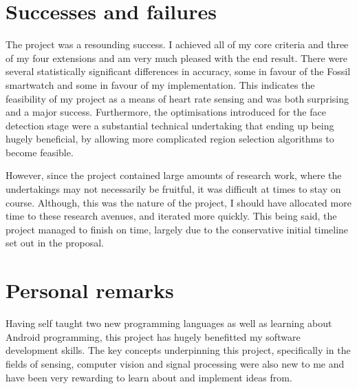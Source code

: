 \section{Successes and failures}
The project was a resounding success. I achieved all of my core criteria and three of my four extensions and am very much pleased with the end result.
There were several statistically significant differences in accuracy, some in favour of the Fossil smartwatch and some in favour of my implementation.
This indicates the feasibility of my project as a means of heart rate sensing and was both surprising and a major success. 
Furthermore, the optimisations introduced for the face detection stage were a substantial technical undertaking that ending up being hugely beneficial, by
allowing more complicated region selection algorithms to become feasible.
\par 
However, since the project contained large amounts of research work, where the undertakings may not necessarily be fruitful, it was difficult at times to stay on course.
Although, this was the nature of the project, I should have allocated more time to these research avenues, and iterated more quickly. This being said, the project
managed to finish on time, largely due to the conservative initial timeline set out in the proposal.

\section{Personal remarks}
Having self taught two new programming languages as well as learning about Android programming, this project has hugely benefitted my software development 
skills. The key concepts underpinning this project, specifically in the fields of sensing, computer vision and signal processing were also new to me 
and have been very rewarding to learn about and implement ideas from.

